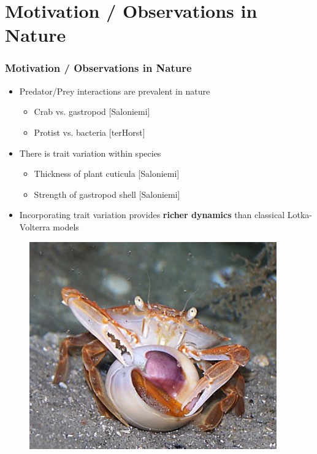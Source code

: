 \documentclass[10pt]{beamer}
\begin{document}
\section{Motivation / Observations in Nature}
\begin{frame}
	\frametitle{Motivation / Observations in Nature}
\begin{minipage}{0.65\textwidth}
	\begin{itemize}
		\item Predator/Prey interactions are prevalent in nature
		\begin{itemize}
			\item Crab vs. gastropod {\tiny[Saloniemi]}
			\item Protist vs. bacteria {\tiny[terHorst]}
		\end{itemize}
		\item There is trait variation within species
		\begin{itemize}
			\item Thickness of plant cuticula {\tiny[Saloniemi]}
			\item Strength of gastropod shell {\tiny[Saloniemi]}
		\end{itemize}
		\item Incorporating trait variation provides {\bf richer dynamics} than classical Lotka-Volterra models
	\end{itemize}
	\end{minipage}
	\begin{minipage}{0.25\textwidth}
	\begin{figure}
	\includegraphics[width=0.95\textwidth]{figures/crab_eating_gastropod.jpg}
	\end{figure}
	\end{minipage}
\end{frame}
\end{document}
